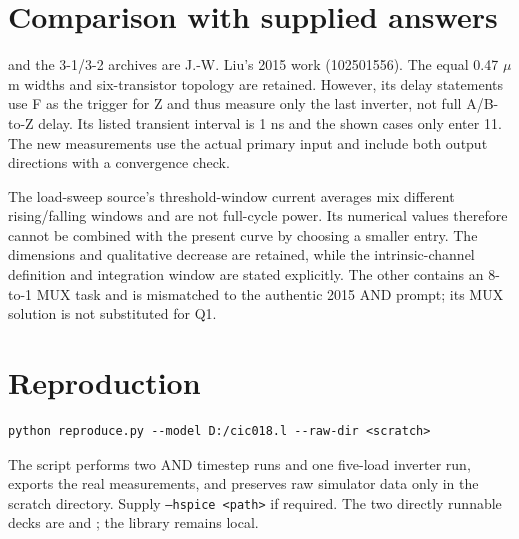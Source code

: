 \documentclass[11pt]{article}
\begin{document}
\section*{Comparison with supplied answers}
 and the 3-1/3-2 archives are J.-W. Liu's 2015 work (102501556). The equal 0.47 $\mu$m widths and six-transistor topology are retained. However, its delay statements use F as the trigger for Z and thus measure only the last inverter, not full A/B-to-Z delay. Its listed transient interval is 1 ns and the shown cases only enter 11. The new measurements use the actual primary input and include both output directions with a convergence check.

The load-sweep source's threshold-window current averages mix different rising/falling windows and are not full-cycle power. Its numerical values therefore cannot be combined with the present curve by choosing a smaller entry. The dimensions and qualitative decrease are retained, while the intrinsic-channel definition and integration window are stated explicitly. The other  contains an 8-to-1 MUX task and is mismatched to the authentic 2015 AND prompt; its MUX solution is not substituted for Q1.

\section*{Reproduction}
\begin{lstlisting}
python reproduce.py --model D:/cic018.l --raw-dir <scratch>
\end{lstlisting}
The script performs two AND timestep runs and one five-load inverter run, exports the real measurements, and preserves raw simulator data only in the scratch directory. Supply \texttt{--hspice <path>} if required. The two directly runnable decks are  and ; the library remains local.
\end{document}
